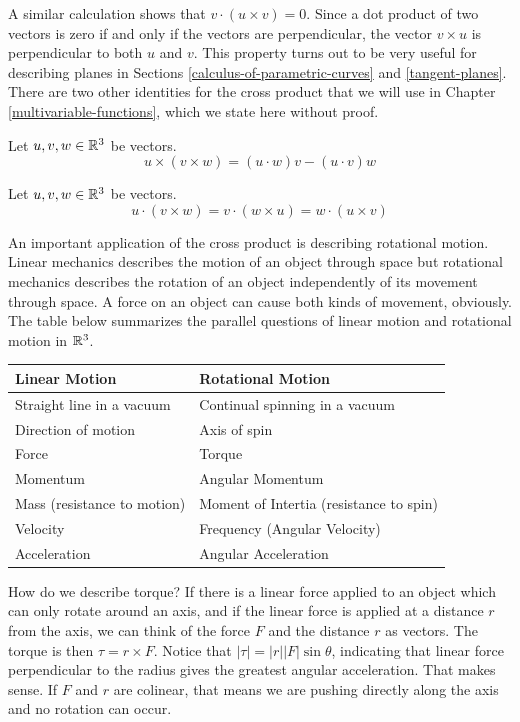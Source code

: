 \documentclass[fleqn,letterpaper]{report}
\begin{document}
A similar calculation shows that $v \cdot (u \times v) = 0$.
Since a dot product of two vectors is zero if and only if the
vectors are perpendicular, the vector $v \times u$ is
perpendicular to both $u$ and $v$. This property turns out to
be very useful for describing planes in Sections
\ref{calculus-of-parametric-curves} and \ref{tangent-planes}.
There are two other identities for the cross product that we
will use in Chapter \ref{multivariable-functions}, which we
state here without proof. 

\begin{prop}
\label{prop-triple-cross-product}
Let $u,v,w \in \mathbb{R}^3$ be vectors. 
\begin{equation*}
u \times (v \times w) = (u \cdot w) v - (u \cdot v) w
\end{equation*}
\end{prop}

\begin{prop}
\label{prop-cross-dot-product}
Let $u,v,w \in \mathbb{R}^3$ be vectors. 
\begin{equation*}
u \cdot (v \times w) = v \cdot (w \times u) = w \cdot (u
\times v) 
\end{equation*}
\end{prop}

An important application of the cross product is describing
rotational motion. Linear mechanics describes the motion of
an object through space but rotational mechanics describes the
rotation of an object independently of its movement through
space. A force on an object can cause both kinds of movement,
obviously. The table below summarizes the parallel questions of
linear motion and rotational motion in $\mathbb{R}^3$.

\begin{tabular}{l|l}
Linear Motion & Rotational Motion \\
\hline
Straight line in a vacuum & Continual spinning in a vacuum \\
Direction of motion & Axis of spin \\
Force & Torque \\
Momentum & Angular Momentum \\
Mass (resistance to motion) & Moment of Intertia (resistance
to spin) \\
Velocity & Frequency (Angular Velocity) \\
Acceleration & Angular Acceleration
\end{tabular}

How do we describe torque? If there is a linear force applied
to an object which can only rotate around an axis, and if
the linear force is applied at a distance $r$ from the axis,
we can think of the force $F$ and the distance $r$ as vectors.
The torque is then $\tau = r \times F$. Notice that $|\tau|
= |r||F| \sin \theta$, indicating that linear force
perpendicular to the radius gives the greatest angular
acceleration. That makes sense. If $F$ and $r$ are colinear,
that means we are pushing directly along the axis and no
rotation can occur. 
\end{document}
